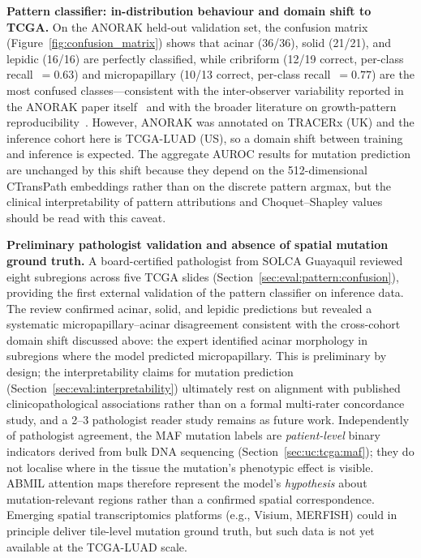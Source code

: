 \textbf{Pattern classifier: in-distribution behaviour and domain
shift to TCGA.}
On the ANORAK held-out validation set, the confusion matrix
(Figure~\ref{fig:confusion_matrix}) shows that acinar (36/36),
solid (21/21), and lepidic (16/16) are perfectly classified, while
cribriform (12/19 correct, per-class recall~$=0.63$) and
micropapillary (10/13 correct, per-class recall~$=0.77$) are the
most confused classes---consistent with the inter-observer
variability reported in the ANORAK paper itself~\cite{anorak2024}
and with the broader literature on growth-pattern
reproducibility~\cite{thunnissen2012reproducibility}.
However, ANORAK was annotated on TRACERx (UK) and the inference
cohort here is TCGA-LUAD (US), so a domain shift between training
and inference is expected.
The aggregate AUROC results for mutation prediction are unchanged
by this shift because they depend on the 512-dimensional
CTransPath embeddings rather than on the discrete pattern argmax,
but the clinical interpretability of pattern attributions and
Choquet--Shapley values should be read with this caveat.

\textbf{Preliminary pathologist validation and absence of spatial
mutation ground truth.}
A board-certified pathologist from SOLCA Guayaquil reviewed eight
subregions across five TCGA slides
(Section~\ref{sec:eval:pattern:confusion}), providing the first
external validation of the pattern classifier on inference data.
The review confirmed acinar, solid, and lepidic predictions but
revealed a systematic micropapillary--acinar disagreement
consistent with the cross-cohort domain shift discussed above:
the expert identified acinar morphology in subregions where the
model predicted micropapillary.
This is preliminary by design; the interpretability claims for
mutation prediction (Section~\ref{sec:eval:interpretability})
ultimately rest on alignment with published clinicopathological
associations rather than on a formal multi-rater concordance study,
and a 2--3 pathologist reader study remains as future work.
Independently of pathologist agreement, the MAF mutation labels
are \emph{patient-level} binary indicators derived from bulk DNA
sequencing (Section~\ref{sec:uc:tcga:maf}); they do not localise
where in the tissue the mutation's phenotypic effect is visible.
ABMIL attention maps therefore represent the model's
\emph{hypothesis} about mutation-relevant regions rather than a
confirmed spatial correspondence.
Emerging spatial transcriptomics platforms (e.g., Visium, MERFISH)
could in principle deliver tile-level mutation ground truth, but
such data is not yet available at the TCGA-LUAD scale.

